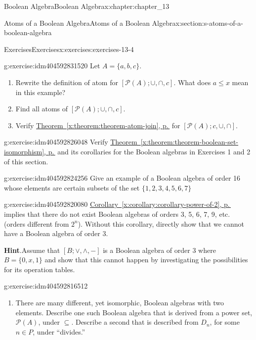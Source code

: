 \documentclass[twoside,10pt,]{book}
\newcommand{\blocktitlefont}{\relax}
\newcommand{\xreffont}{\relax}
\numberwithin{equation}{section}
\begin{document}
\begin{chapterptx}{Boolean Algebra}{}{Boolean Algebra}{}{}{x:chapter:chapter_13}
\begin{sectionptx}{Atoms of a Boolean Algebra}{}{Atoms of a Boolean Algebra}{}{}{x:section:s-atoms-of-a-boolean-algebra}
\begin{exercises-subsection}{Exercises}{}{Exercises}{}{}{x:exercises:exercises-13-4}
\begin{divisionexercise}{2}{}{}{g:exercise:idm404592831520}
Let \(A = \{a, b, c\}\).%
\begin{enumerate}[label=(\alph*)]
\item{}Rewrite the definition of atom for \([\mathcal{P}(A); \cup , \cap, c ]\). What does \(a \leq  x\) mean in this example?%
\item{}Find all atoms of \([\mathcal{P}(A); \cup , \cap, c ]\).%
\item{}Verify \hyperref[x:theorem:theorem-atom-join]{Theorem~{\xreffont\ref{x:theorem:theorem-atom-join}}, p.\,\pageref{x:theorem:theorem-atom-join}} for \([\mathcal{P}(A); c, \cup , \cap ]\).%
\end{enumerate}
%
\end{divisionexercise}%
\begin{divisionexercise}{3}{}{}{g:exercise:idm404592826048}%
Verify \hyperref[x:theorem:theorem-boolean-set-isomorphism]{Theorem~{\xreffont\ref{x:theorem:theorem-boolean-set-isomorphism}}, p.\,\pageref{x:theorem:theorem-boolean-set-isomorphism}} and its corollaries for the Boolean algebras in Exercises 1 and 2 of this section.%
\end{divisionexercise}%
\begin{divisionexercise}{4}{}{}{g:exercise:idm404592824256}%
Give an example of a Boolean algebra of order 16 whose elements are certain subsets of the set \(\{1, 2, 3, 4, 5, 6, 7\}\)%
\end{divisionexercise}%
\begin{divisionexercise}{5}{}{}{g:exercise:idm404592820080}%
\hyperref[x:corollary:corollary-power-of-2]{Corollary~{\xreffont\ref{x:corollary:corollary-power-of-2}}, p.\,\pageref{x:corollary:corollary-power-of-2}} implies that there do not exist Boolean algebras of orders 3, 5, 6, 7, 9, etc. (orders different from \(2^n\)). Without this corollary, directly show that we cannot have a Boolean algebra of order 3.%
\par\smallskip%
\noindent\textbf{\blocktitlefont Hint}.\label{g:hint:idm404592818192}{}\hypertarget{g:hint:idm404592818192}{}\quad{}Assume that \([B; \lor , \land, - ]\) is a Boolean algebra of order 3 where \(B = \{0,
x, 1\}\) and show that this cannot happen by investigating the possibilities for its operation tables.%
\end{divisionexercise}%
\begin{divisionexercise}{6}{}{}{g:exercise:idm404592816512}%
%
\begin{enumerate}[label=(\alph*)]
\item{}There are many different, yet isomorphic, Boolean algebras with two elements. Describe one such Boolean algebra that is derived from a power set, \(\mathcal{P}(A)\), under \(\subseteq\). Describe a second that is described from \(D_n\), for some \(n \in  P\), under ``divides.''%

\end{enumerate}
\end{divisionexercise}
\end{exercises-subsection}
\end{sectionptx}
\end{chapterptx}
\end{document}
